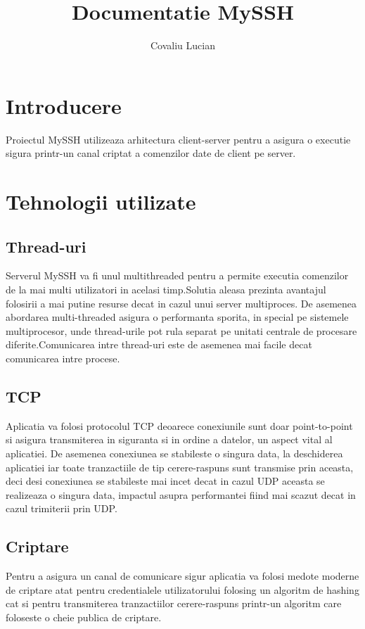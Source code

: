 \documentclass{llncs}
\begin{document}
%

%
\title{Documentatie MySSH}
%
\author{Covaliu Lucian}


\maketitle              %

%
\section{Introducere}
%
Proiectul MySSH utilizeaza arhitectura client-server pentru a asigura o executie sigura printr-un canal criptat a comenzilor date de client pe server.
%
\section{Tehnologii utilizate}
%
%
\subsection{Thread-uri}
%
Serverul MySSH va fi unul multithreaded pentru a permite executia comenzilor de la mai multi utilizatori in acelasi timp.Solutia aleasa prezinta avantajul folosirii a mai putine resurse decat in cazul unui server multiproces. De asemenea abordarea multi-threaded asigura o performanta sporita, in special pe sistemele multiprocesor, unde thread-urile pot rula separat pe unitati centrale de procesare diferite.Comunicarea intre thread-uri este de asemenea mai facile decat comunicarea intre procese.
%
\subsection{TCP}
%
Aplicatia va folosi protocolul TCP deoarece conexiunile sunt doar point-to-point si asigura transmiterea in siguranta si in ordine a datelor, un aspect vital al aplicatiei. De asemenea conexiunea se stabileste o singura data, la deschiderea aplicatiei iar toate tranzactiile de tip cerere-raspuns sunt transmise prin aceasta, deci desi conexiunea se stabileste mai incet decat in cazul UDP aceasta se realizeaza o singura data, impactul asupra performantei fiind mai scazut decat in cazul trimiterii prin UDP.
%
\subsection{Criptare}
%
Pentru a asigura un canal de comunicare sigur aplicatia va folosi medote moderne de criptare atat pentru credentialele utilizatorului folosing un algoritm de hashing cat si pentru transmiterea tranzactiilor cerere-raspuns printr-un algoritm care foloseste o cheie publica de criptare.
%
\end{document}
